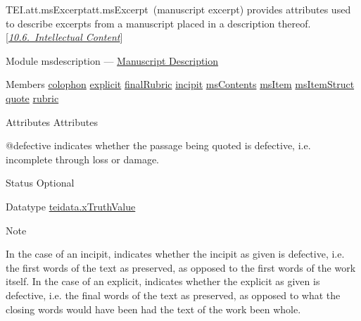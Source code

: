 \begin{reflist}
\item[]\begin{specHead}{TEI.att.msExcerpt}{att.msExcerpt} (manuscript excerpt) provides attributes used to describe excerpts from a manuscript placed in a description thereof. [\textit{\hyperref[msco]{10.6.\ Intellectual Content}}]\end{specHead} 
    \item[{Module}]
  msdescription — \hyperref[MS]{Manuscript Description}
    \item[{Members}]
  \hyperref[TEI.colophon]{colophon} \hyperref[TEI.explicit]{explicit} \hyperref[TEI.finalRubric]{finalRubric} \hyperref[TEI.incipit]{incipit} \hyperref[TEI.msContents]{msContents} \hyperref[TEI.msItem]{msItem} \hyperref[TEI.msItemStruct]{msItemStruct} \hyperref[TEI.quote]{quote} \hyperref[TEI.rubric]{rubric}
    \item[{Attributes}]
  Attributes\hfil\\[-10pt]\begin{sansreflist}
    \item[@defective]
  indicates whether the passage being quoted is defective, i.e. incomplete through loss or damage.
\begin{reflist}
    \item[{Status}]
  Optional
    \item[{Datatype}]
  \hyperref[TEI.teidata.xTruthValue]{teidata.xTruthValue}
\end{reflist}  
\end{sansreflist}  
    \item[{Note}]
  \par
In the case of an incipit, indicates whether the incipit as given is defective, i.e. the first words of the text as preserved, as opposed to the first words of the work itself. In the case of an explicit, indicates whether the explicit as given is defective, i.e. the final words of the text as preserved, as opposed to what the closing words would have been had the text of the work been whole.
\end{reflist}  
